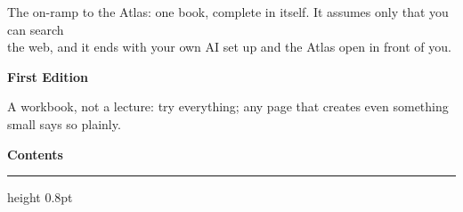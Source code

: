 \begin{titlepage}
{\sffamily\footnotesize\color{softblack!60}
The on-ramp to the Atlas: one book, complete in itself. It assumes only that you can search\\
the web, and it ends with your own AI set up and the Atlas open in front of you.\par}
\vspace{16pt minus 6pt}
{\sffamily\small\color{accentlt}\textbf{First Edition}\par}
\vspace{4pt minus 1pt}
{\sffamily\footnotesize\color{softblack!55} A workbook, not a lecture: try everything; any page that creates even something small says so plainly.\par}
\vspace{1.0cm minus 0.7cm}
\end{titlepage}

\setcounter{page}{2}

\clearpage
\thispagestyle{plain}
{\sffamily\Large\bfseries\color{accent}Contents\par}\vspace{6pt}
{\color{rulegray}\hrule height 0.8pt}\vspace{10pt}
\makeatletter
{}
\makeatother
\clearpage
